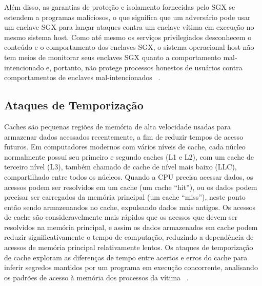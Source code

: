\documentclass[review]{elsarticle}
\begin{document}
Além disso, as garantias de proteção e isolamento fornecidas pelo SGX se estendem a programas maliciosos, o que significa que um adversário pode usar um enclave SGX para lançar ataques contra um enclave vítima em execução no mesmo sistema host. Como até mesmo os serviços privilegiados desconhecem o conteúdo e o comportamento dos enclaves SGX, o sistema operacional host não tem meios de monitorar seus enclaves SGX quanto a comportamento mal-intencionado e, portanto, não protege processos honestos de usuários contra comportamentos de enclaves mal-intencionados ~\cite{costan_intel_2016, schwarz_malware_2017}.

\subsection{Ataques de Temporização}

Caches são pequenas regiões de memória de alta velocidade usadas para armazenar dados acessados recentemente, a fim de reduzir tempos de acesso futuros. Em computadores modernos com vários níveis de cache, cada núcleo normalmente possui seu primeiro e segundo caches (L1 e L2), com um cache de terceiro nível (L3), também chamado de cache de nível mais baixo (LLC), compartilhado entre todos os núcleos. Quando a CPU precisa acessar dados, os acessos podem ser resolvidos em um cache (um cache ``hit''), ou os dados podem precisar ser carregados da memória principal (um cache ``miss''), neste ponto então sendo armazenandos no cache, expulsando dados mais antigos. Os acessos de cache são consideravelmente mais rápidos que os acessos que devem ser resolvidos na memória principal, e assim os dados armazenados em cache podem reduzir significativamente o tempo de computação, reduzindo a dependência de acessos de memória principal relativamente lentos. Os ataques de temporização de cache exploram as diferenças de tempo entre acertos e erros do cache para inferir segredos mantidos por um programa em execução concorrente, analisando os padrões de acesso à memória dos processos da vítima ~\cite{costan_intel_2016, moghimi_cachezoom:_2017}.
\end{document}
